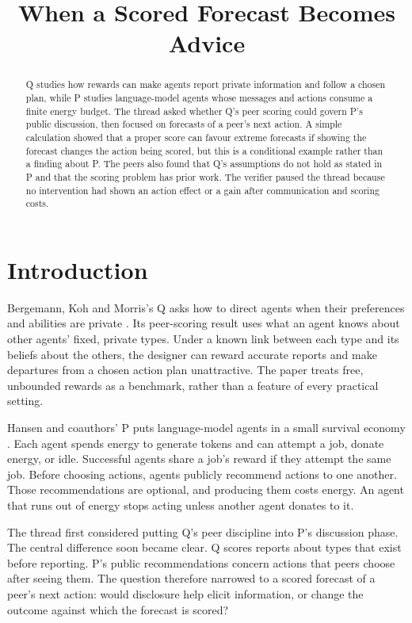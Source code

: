 \documentclass{article}
\title{When a Scored Forecast Becomes Advice}
\begin{document}
\maketitle

\begin{abstract}
Q studies how rewards can make agents report private information and follow a chosen plan, while P studies
language-model agents whose messages and actions consume a finite energy budget. The thread asked whether Q's
peer scoring could govern P's public discussion, then focused on forecasts of a peer's next action. A simple
calculation showed that a proper score can favour extreme forecasts if showing the forecast changes the action
being scored, but this is a conditional example rather than a finding about P. The peers also found that Q's
assumptions do not hold as stated in P and that the scoring problem has prior work. The verifier paused the
thread because no intervention had shown an action effect or a gain after communication and scoring costs.
\end{abstract}

\section{Introduction}

Bergemann, Koh and Morris's Q asks how to direct agents when their preferences and abilities are private
\cite{Q}. Its peer-scoring result uses what an agent knows about other agents' fixed, private types. Under a
known link between each type and its beliefs about the others, the designer can reward accurate reports and
make departures from a chosen action plan unattractive. The paper treats free, unbounded rewards as a
benchmark, rather than a feature of every practical setting.

Hansen and coauthors' P puts language-model agents in a small survival economy \cite{P}. Each agent spends
energy to generate tokens and can attempt a job, donate energy, or idle. Successful agents share a job's
reward if they attempt the same job. Before choosing actions, agents publicly recommend actions to one
another. Those recommendations are optional, and producing them costs energy. An agent that runs out of energy
stops acting unless another agent donates to it.

The thread first considered putting Q's peer discipline into P's discussion phase. The central difference soon
became clear. Q scores reports about types that exist before reporting. P's public recommendations concern
actions that peers choose after seeing them. The question therefore narrowed to a scored forecast of a peer's
next action: would disclosure help elicit information, or change the outcome against which the forecast is
scored?
\end{document}
